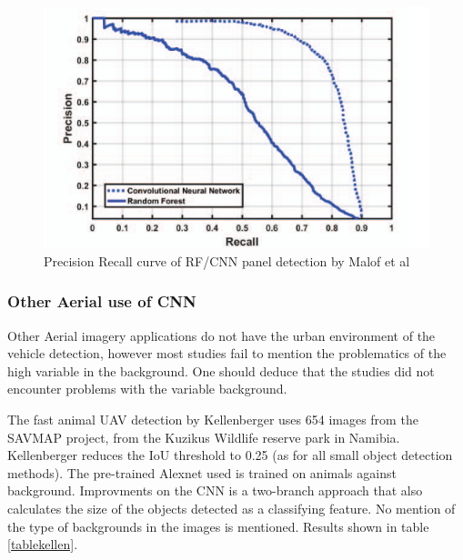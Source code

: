 \documentclass{IEEEtran}
\begin{document}
\begin{figure}[h]
\centering
\label{curvepanel}
\includegraphics[scale=0.4]{images/pvpanels.png}
\caption{Precision Recall curve of RF/CNN panel detection by Malof et al \cite{Malof2016}}
\end{figure}


\subsubsection{Other Aerial use of CNN}

Other Aerial imagery applications do not have the urban environment of the vehicle detection, however most studies fail to mention the problematics of the high variable in the background. One should deduce that the studies did not encounter problems with the variable background.\newline

The fast animal UAV detection by Kellenberger \cite{Kellenberger2017} uses 654 images from the SAVMAP project, from the Kuzikus Wildlife reserve park in Namibia. Kellenberger reduces the IoU threshold to 0.25 (as for all small object detection methods). The pre-trained Alexnet used is trained on animals against background. Improvments on the CNN is a two-branch approach that also calculates the size of the objects detected as a classifying feature. No mention of the type of backgrounds in the images is mentioned. Results shown in table \ref{tablekellen}. 
\end{document}
